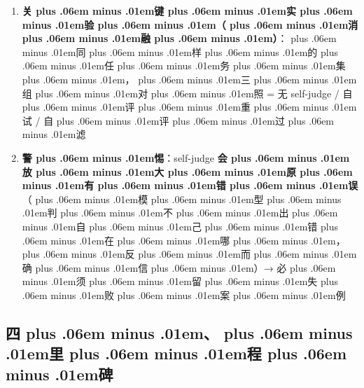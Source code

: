 \documentclass[
]{article}
\providecommand{\tightlist}{%
  \setlength{\itemsep}{0pt}\setlength{\parskip}{0pt}}
\def\zh#1{{\zhfont #1}}
\def\sym#1{{\symfont #1}}
\def\zhglue{\hskip0pt plus .06em minus .01em}
\begin{document}
\begin{enumerate}
  \begin{itemize}
  \tightlist
  \item
    \textbf{\zh{自\zhglue 评\zhglue 重\zhglue 试}}\zh{：\zhglue 模\zhglue 型\zhglue 给\zhglue 自\zhglue 己\zhglue 打\zhglue 分\zhglue ，\zhglue 低\zhglue 于\zhglue 阈\zhglue 值\zhglue 就\zhglue 重\zhglue 做\zhglue （}rasbt ch5 \zh{的} self-refinement\zh{）}
  \item
    \textbf{\zh{自\zhglue 评\zhglue 过\zhglue 滤}}\zh{：\zhglue 生\zhglue 成\zhglue 多\zhglue 个\zhglue 候\zhglue 选\zhglue ，\zhglue 自\zhglue 己\zhglue 挑\zhglue 最\zhglue 好\zhglue 的\zhglue （}best-of-N \zh{的\zhglue 变\zhglue 体\zhglue ）}
  \end{itemize}
\item
  \textbf{\zh{关\zhglue 键\zhglue 实\zhglue 验\zhglue （\zhglue 消\zhglue 融\zhglue ）}}\zh{：\zhglue 同\zhglue 样\zhglue 的\zhglue 任\zhglue 务\zhglue 集\zhglue ，\zhglue 三\zhglue 组\zhglue 对\zhglue 照} = \zh{无} self-judge / \zh{自\zhglue 评\zhglue 重\zhglue 试} / \zh{自\zhglue 评\zhglue 过\zhglue 滤}
\item
  \textbf{\zh{警\zhglue 惕}}\zh{：}self-judge \textbf{\zh{会\zhglue 放\zhglue 大\zhglue 原\zhglue 有\zhglue 错\zhglue 误}}\zh{（\zhglue 模\zhglue 型\zhglue 判\zhglue 不\zhglue 出\zhglue 自\zhglue 己\zhglue 错\zhglue 在\zhglue 哪\zhglue ，\zhglue 反\zhglue 而\zhglue 确\zhglue 信\zhglue ）}\sym{→} \zh{必\zhglue 须\zhglue 留\zhglue 失\zhglue 败\zhglue 案\zhglue 例}
\end{enumerate}

\subsection{\zh{四\zhglue 、\zhglue 里\zhglue 程\zhglue 碑}}\label{ux56dbux91ccux7a0bux7891-8}
\end{document}
